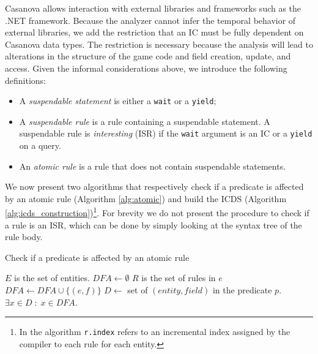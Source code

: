 Casanova allows interaction with external libraries and frameworks such as the .NET framework. Because the analyzer cannot infer the temporal behavior of external libraries, we add the restriction that an IC must be fully dependent on Casanova data types. The restriction is necessary because the analysis will lead to alterations in the structure of the game code and field creation, update, and access. Given the informal considerations above, we introduce the following definitions:
\begin{itemize}
\item A \textit{suspendable statement} is either a \texttt{wait} or a \texttt{yield};
\item A \textit{suspendable rule} is a rule containing a suspendable statement. A suspendable rule is \textit{interesting} (ISR) if the \texttt{wait} argument is an IC or a \texttt{yield} on a query.
\item An \textit{atomic rule} is a rule that does not contain suspendable statements.
\end{itemize}

We now present two algorithms that respectively check if a predicate is affected by an atomic rule (Algorithm \ref{alg:atomic}) and build the ICDS (Algorithm \ref{alg:icds_construction})\footnote{In the algorithm \texttt{r.index} refers to an incremental index assigned by the compiler to each rule for each entity.}. For brevity we do not present the procedure to check if a rule is an ISR, which can be done by simply looking at the syntax tree of the rule body.


\begin{algorithm}
	
\caption{Check if a predicate is affected by an atomic rule}

\label{alg:atomic}
\begin{algorithmic}
    \State $E$ is the set of entities.
    \State $DFA \gets \emptyset$
        \State $R$ is the set of rules in $e$
                    \State $DFA \gets DFA \cup \lbrace (e,f) \rbrace$
                \EndFor
            \EndIf
        \EndFor
    \EndFor
    \State $D \gets$ set of $(entity,field)$ in the predicate $p$.
    \State \Return $\exists x \in D \; : \; x \in DFA$.
\EndFunction
\end{algorithmic}
\end{algorithm}

